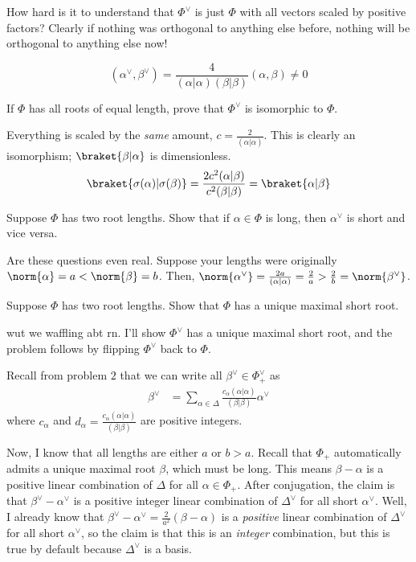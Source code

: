 \documentclass[11pt, headheight=30pt]{scrartcl}
\begin{document}
How hard is it to understand that $\Phi^\vee$ is just $\Phi$ with all vectors
scaled by positive factors? Clearly if nothing was orthogonal to anything else
before, nothing will be orthogonal to anything else now!

\[
    (\alpha^\vee, \beta^\vee) = \frac{4}{(\alpha|\alpha)(\beta|\beta)}(\alpha,\beta) \neq 0    
\]

\begin{prob}
    If $\Phi$ has all roots of equal length, prove that $\Phi^\vee$ is isomorphic to $\Phi$.
\end{prob}

Everything is scaled by the \emph{same} amount, $c = \frac{2}{(\alpha|\alpha)}$.
This is clearly an isomorphism; $\braket{\beta | \alpha}$ is dimensionless.
\[
    \braket{\sigma(\alpha)|\sigma(\beta)} = \frac{2c^2(\alpha|\beta)}{c^2(\beta|\beta)} = \braket{\alpha|\beta}
\]

\begin{prob}
    Suppose $\Phi$ has two root lengths. Show that if $\alpha \in \Phi$ is long, then $\alpha^\vee$ is short and vice versa.
\end{prob}

Are these questions even real. Suppose your lengths were originally
$\norm{\alpha} = a < \norm{\beta} = b$.
Then, $\norm{\alpha^\vee} = \frac{2a}{(\alpha|\alpha)} = \frac{2}{a} > \frac{2}{b} = \norm{\beta^\vee}$.

\begin{prob}
    Suppose $\Phi$ has two root lengths. Show that $\Phi$ has a unique maximal short root.
\end{prob}

wut we waffling abt rn. I'll show $\Phi^\vee$ has a unique maximal short root,
and the problem follows by flipping $\Phi^\vee$ back to $\Phi$.

Recall from problem $2$ that we can write all $\beta^\vee \in \Phi^\vee_+$ as
\begin{align*}
    \beta^\vee &= \sum_{\alpha\in\Delta} \frac{c_\alpha (\alpha|\alpha)}{(\beta|\beta)} \alpha^\vee
\end{align*}
where $c_\alpha$ and $d_\alpha = \frac{c_\alpha (\alpha|\alpha)}{(\beta|\beta)}$
are positive integers.

Now, I know that all lengths are either $a$ or $b > a$. Recall that $\Phi_+$
automatically admits a unique maximal root $\beta$, which must be long.
This means $\beta - \alpha$ is a positive linear combination of $\Delta$
for all $\alpha\in \Phi_+$. After conjugation, the claim is that $\beta^\vee - \alpha^\vee$
is a positive integer linear combination of $\Delta^\vee$ for all short $\alpha^\vee$.
Well, I already know that
$\beta^\vee - \alpha^\vee = \frac{2}{a^2}\left(\beta - \alpha\right)$ is a \emph{positive}
linear combination of $\Delta^\vee$ for all short $\alpha^\vee$, so the claim is
that this is an \emph{integer} combination, but this is true by default
because $\Delta^\vee$ is a basis.
\end{document}
